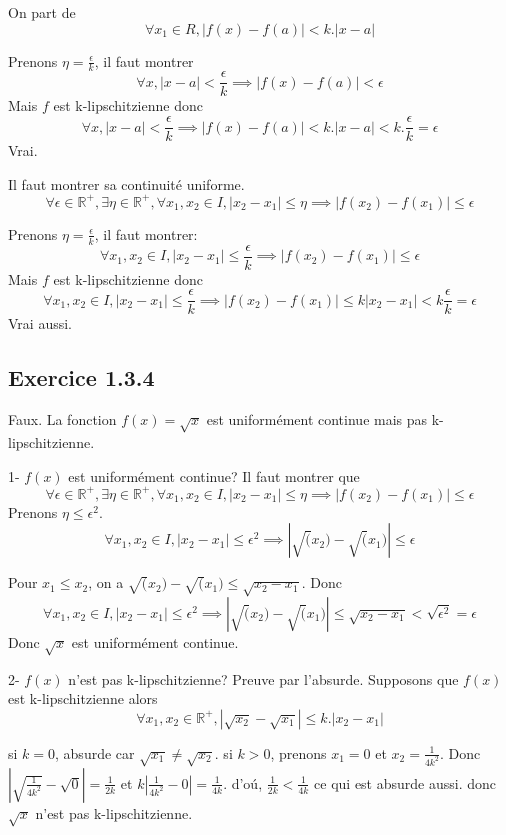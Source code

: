 \documentclass[]{book}
\theoremstyle{definition}
\newcommand{\bb}[1]{\mathbb{#1}}
\newcommand{\R}{\bb{R}}
\begin{document}
On part de 
$$
\forall x_1 \in R, |f(x)-f(a)| < k.|x-a|
$$

Prenons $\eta = \frac{\epsilon}{k}$, il faut montrer 
$$
\forall x, |x-a| < \frac{\epsilon}{k} \implies  |f(x)-f(a)| < \epsilon
$$
Mais $f$ est k-lipschitzienne donc
$$
\forall x, |x-a| < \frac{\epsilon}{k} \implies  |f(x)-f(a)| < k.|x-a| < k. \frac{\epsilon}{k} = \epsilon
$$
Vrai.

Il faut montrer sa continuit\'e uniforme.
$$
\forall \epsilon \in \R^{+}, \exists \eta  \in \R^{+}, \forall x_1, x_2 \in I, |x_2-x_1| \leq \eta \implies  |f(x_2)-f(x_1)| \leq \epsilon
$$

Prenons $\eta = \frac{\epsilon}{k}$, il faut montrer: 
$$
\forall x_1, x_2 \in I, |x_2-x_1| \leq \frac{\epsilon}{k} \implies  |f(x_2)-f(x_1)| \leq \epsilon
$$
Mais $f$ est k-lipschitzienne donc
$$
\forall x_1, x_2 \in I, |x_2-x_1| \leq \frac{\epsilon}{k} \implies  |f(x_2)-f(x_1)| \leq k|x_2-x_1| < k\frac{\epsilon}{k} = \epsilon
$$
Vrai aussi.


\subsection*{Exercice 1.3.4}
Faux. La fonction $f(x) = \sqrt{x}$ est uniform\'ement continue mais pas k-lipschitzienne.

1- $f(x)$ est uniform\'ement continue? Il faut montrer que 
$$
\forall \epsilon \in \R^{+}, \exists \eta  \in \R^{+}, \forall x_1, x_2 \in I, |x_2-x_1| \leq \eta \implies  |f(x_2)-f(x_1)| \leq \epsilon
$$
Prenons $\eta \leq \epsilon^2$.
$$
\forall x_1, x_2 \in I, |x_2-x_1| \leq \epsilon^2 \implies  |\sqrt(x_2)-\sqrt(x_1)| \leq \epsilon
$$

Pour $x_1 \leq x_2$, on a $\sqrt(x_2)-\sqrt(x_1) \leq \sqrt{x_2 - x_1}$. Donc
$$
\forall x_1, x_2 \in I, |x_2-x_1| \leq \epsilon^2 \implies  |\sqrt(x_2)-\sqrt(x_1)| \leq \sqrt{x_2 - x_1} < \sqrt{\epsilon^2} = \epsilon
$$
Donc $\sqrt{x}$ est uniform\'ement continue.


2- $f(x)$ n'est pas k-lipschitzienne? Preuve par l'absurde. Supposons que $f(x)$ est k-lipschitzienne alors
$$
\forall x_1, x_2 \in \R^{+}, |\sqrt{x_2} - \sqrt{x_1}| \leq k.|x_2 - x_1|
$$

si $k = 0$, absurde car $\sqrt{x_1} \neq \sqrt{x_2}$. si $k>0$, prenons $x_1=0$ et $x_2=\frac{1}{4k^2}$. Donc $|\sqrt{\frac{1}{4k^2}} - \sqrt{0}| = \frac{1}{2k}$ et $k|\frac{1}{4k^2}-0| = \frac{1}{4k}$. d'o\'u, $\frac{1}{2k} < \frac{1}{4k}$ ce qui est absurde aussi.
donc $\sqrt{x}$ n'est pas k-lipschitzienne.
\end{document}
